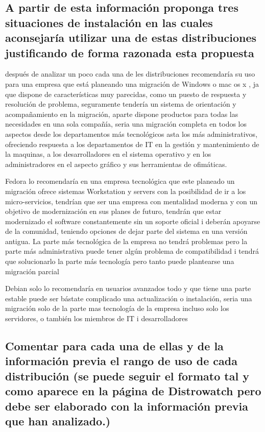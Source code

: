 \documentclass[preprint,11pt]{elsarticle}
\begin{document}
\subsection{A partir de esta información proponga tres situaciones de instalación en las cuales aconsejaría utilizar una de estas distribuciones justificando de forma razonada esta propuesta}\bigskip

después de analizar un poco cada una de les distribuciones recomendaría su uso para una empresa que está planeando una migración de Windows o mac os x , ja que dispone de características muy parecidas, como un puesto de respuesta y resolución de problema, seguramente tendería un sistema de orientación y acompañamiento en la migración, aparte dispone productos para todas las necesidades en una sola compañía, seria una migración completa en todos los aspectos desde los departamentos más tecnológicos asta los más administrativos, ofreciendo respuesta a los departamentos de IT en la gestión y mantenimiento de la maquinas, a los desarrolladores en el sistema operativo y en los administradores en el aspecto gráfico y sus herramientas de ofimáticas.\bigskip

Fedora lo recomendaría en una empresa tecnológica que este planeado un migración ofrece sistemas Workstation y servers con la posibilidad de ir a los micro-servicios, tendrían que ser una empresa con mentalidad moderna y con un objetivo de modernización en sus planes de futuro, tendrán que estar modernizado el software constantemente sin un soporte oficial i deberán apoyarse de la comunidad, teniendo opciones de dejar parte del sistema en una versión antigua. La parte más tecnológica de la empresa no tendrá problemas pero la parte más administrativa puede tener algún problema de compatibilidad i tendrá que solucionarlo la parte más tecnología pero tanto puede plantearse una migración parcial\bigskip

Debian solo lo recomendaría en usuarios avanzados todo y que tiene una parte estable puede ser bástate complicado una actualización o instalación, seria una migración solo de la parte mas tecnología de la empresa incluso solo los servidores, o también los miembros de IT i desarrolladores\bigskip

\subsection{ Comentar para cada una de ellas y de la información previa el rango de uso de cada distribución (se puede seguir el formato tal y como aparece en la página de Distrowatch pero debe ser elaborado con la información previa que han analizado.)}\bigskip
\end{document}
